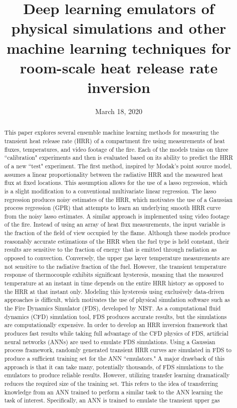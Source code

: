 \documentclass{article}
\begin{document}
\title{Deep learning emulators of physical simulations and other machine learning techniques for room-scale heat release rate inversion}
\author{}
\date{March 18, 2020}

\maketitle

\begin{abstract}
This paper explores several ensemble machine learning methods for measuring the transient heat release rate (HRR) of a compartment fire using measurements of heat fluxes, temperatures, and video footage of the fire. Each of the models trains on three ``calibration" experiments and then is evaluated based on its ability to predict the HRR of a new ``test" experiment. The first method, inspired by Modak's point source model, assumes a linear proportionality between the radiative HRR and the measured heat flux at fixed locations. This assumption allows for the use of a lasso regression, which is a slight modification to a conventional multivariate linear regression. The lasso regression produces noisy estimates of the HRR, which motivates the use of a Gaussian process regression (GPR) that attempts to learn an underlying smooth HRR curve from the noisy lasso estimates. A similar approach is implemented using video footage of the fire. Instead of using an array of heat flux measurements, the input variable is the fraction of the field of view occupied by the flame. Although these models produce reasonably accurate estimations of the HRR when the fuel type is held constant, their results are sensitive to the fraction of energy that is emitted through radiation as opposed to convection. Conversely, the upper gas layer temperature measurements are not sensitive to the radiative fraction of the fuel. However, the transient temperature response of thermocouple exhibits significant hysteresis, meaning that the measured temperature at an instant in time depends on the entire HRR history as opposed to the HRR at that instant only. Modeling this hysteresis using exclusively data-driven approaches is difficult, which motivates the use of physical simulation software such as the Fire Dynamics Simulator (FDS), developed by NIST. As a computational fluid dynamics (CFD) simulation tool, FDS produces accurate results, but the simulations are computationally expensive. In order to develop an HRR inversion framework that produces fast results while taking full advantage of the CFD physics of FDS, artificial neural networks (ANNs) are used to emulate FDS simulations. Using a Gaussian process framework, randomly generated transient HRR curves are simulated in FDS to produce a sufficient training set for the ANN ``emulators." A major drawback of this approach is that it can take many, potentially thousands, of FDS simulations to the emulators to produce reliable results. However, utilizing transfer learning dramatically reduces the required size of the training set. This refers to the idea of transferring knowledge from an ANN trained to perform a similar task to the ANN learning the task of interest. Specifically, an ANN is trained to emulate the transient upper gas 
\end{abstract}
\end{document}
